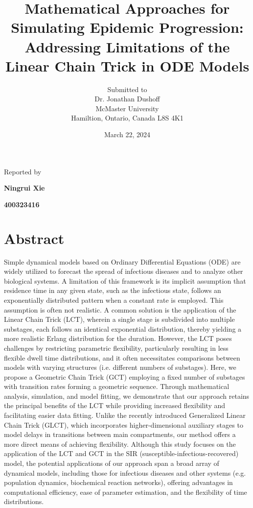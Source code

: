 \documentclass[12pt]{article}
\begin{document}
\title{Mathematical Approaches for Simulating Epidemic Progression: Addressing Limitations of the Linear Chain Trick in ODE Models}

\author{Submitted to\\ Dr. Jonathan Dushoff 
\\McMaster University\\Hamiltion, Ontario, Canada L8S 4K1}
\date {March 22, 2024}
\maketitle


\centerline{Reported by}
\centerline{\textbf{Ningrui Xie}}
\centerline{\textbf{400323416}}


\newpage
\section{Abstract}
Simple dynamical models based on Ordinary Differential Equations (ODE) are widely utilized to forecast the spread of infectious diseases and to analyze other biological systems. A limitation of this framework is its implicit assumption that residence time in any given state, such as the infectious state, follows an exponentially distributed pattern when a constant rate is employed. This assumption is often not realistic. A common solution is the application of the Linear Chain Trick (LCT), wherein a single stage is subdivided into multiple substages, each follows an identical exponential distribution, thereby yielding a more realistic Erlang distribution for the duration. However, the LCT poses challenges by restricting parametric flexibility, particularly resulting in less flexible dwell time distributions, and it often necessitates comparisons between models with varying structures (i.e. different numbers of substages). Here, we propose a Geometric Chain Trick (GCT) employing a fixed number of substages with transition rates forming a geometric sequence. Through mathematical analysis, simulation, and model fitting, we demonstrate that our approach retains the principal benefits of the LCT while providing increased flexibility and facilitating easier data fitting. Unlike the recently introduced Generalized Linear Chain Trick (GLCT), which incorporates higher-dimensional auxiliary stages to model delays in transitions between main compartments, our method offers a more direct means of achieving flexibility. Although this study focuses on the application of the LCT and GCT in the SIR (susceptible-infectious-recovered) model, the potential applications of our approach span a broad array of dynamical models, including those for infectious diseases and other systems (e.g. population dynamics, biochemical reaction networks), offering advantages in computational efficiency, ease of parameter estimation, and the flexibility of time distributions.
\end{document}
